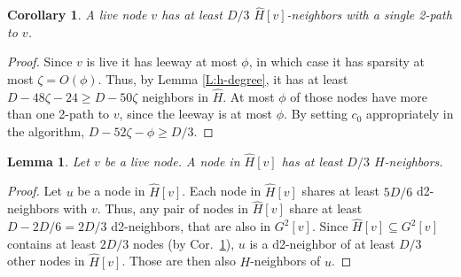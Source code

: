 \documentclass[12pt,a4]{article}
\newtheorem{lemma}[theorem]{Lemma}
\newtheorem{corollary}[theorem]{Corollary}
\begin{document}
\iffalse
\begin{lemma}
A node of sparsity $\zeta$ has at least $D - 24\zeta -12$ neighbors in $H$. 
\label{L:h-degree}
\end{lemma}
 
 \begin{proof}
 Let $v$ be a $\zeta$-sparse node.
A d2-neighbor of $v$ that is not a $H$-neighbor can share 
at most $\nicefrac{11}{12}\, D$ common d2-neighbors with $v$, by Thm.~\ref{thm:similarity}. 
Thus, the number of 2-paths of $G[N_{G^2}(v)]$ is upper bounded by $|N_H(v)| D + (D - |N_H(v)|) \nicefrac{11}{12}\, D = D(\nicefrac{11}{12}\, D + |N_H(v)|/12)$.
The number of edges in $G^2[v]$ equals $D((D-1)/2 - \zeta$, by the definition of sparsity, and also equals
half the number of 2-paths of $G[N_{G^2}(v)]$. 
Combining the two bounds on the number of edges in $G^2[v]$ we get that $D/24-1/2 -\zeta \le |N_H(v)|/24$. Namely, the number of $H$-neighbors is bounded below by $|N_H(v)| \ge D - 24\zeta -12$.
\end{proof}
\fi

\begin{corollary}
A live node $v$ has at least $D/3$ $\hat{H}[v]$-neighbors with a single 2-path to $v$.
\label{C:hat-neighbors}
\end{corollary}

\begin{proof}
Since $v$ is live it has leeway at most $\phi$, in which case it has sparsity at most $\zeta = O(\phi)$. Thus, by Lemma \ref{L:h-degree}, it has at least $D - 48\zeta - 24 \ge D - 50\zeta$ neighbors in $\hat{H}$.
At most $\phi$ of those nodes have more than one 2-path to $v$, since the leeway is at most $\phi$.
By setting $c_0$ appropriately in the algorithm, $D-52\zeta-\phi \ge D/3$.
\end{proof}


\begin{lemma}
Let $v$ be a live node.
A node in $\hat{H}[v]$ has at least $D/3$ $H$-neighbors.
\label{L:H-neighbors}
\end{lemma}

\begin{proof}
Let $u$ be a node in $\hat{H}[v]$. 
Each node in $\hat{H}[v]$ shares at least $5D/6$ d2-neighbors with $v$. Thus, any pair of nodes in $\hat{H}[v]$ share at least $D - 2D/6 = 2D/3$ d2-neighbors, that are also in $G^2[v]$. Since $\hat{H}[v] \subseteq G^2[v]$ contains at least $2D/3$ nodes (by Cor.~\ref{C:hat-neighbors}), $u$ is a d2-neighbor of at least $D/3$ other nodes in $\hat{H}[v]$. Those are then also $H$-neighbors of $u$.
\end{proof}
\end{document}
